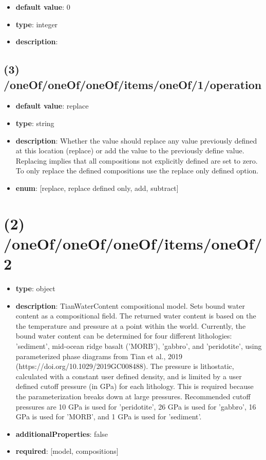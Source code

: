 \begin{itemize}[leftmargin=4em]\item {\bf default value}: 0
\item {\bf type}: integer
\item {\bf description}: 
\end{itemize}\subsection{(3) /oneOf/oneOf/oneOf/items/oneOf/1/operation}
\begin{itemize}[leftmargin=3em]\item {\bf default value}: replace
\item {\bf type}: string
\item {\bf description}: Whether the value should replace any value previously defined at this location (replace) or add the value to the previously define value. Replacing implies that all compositions not explicitly defined are set to zero. To only replace the defined compositions use the replace only defined option.
\item {\bf enum}: [replace, replace defined only, add, subtract]\end{itemize}\section{(2) /oneOf/oneOf/oneOf/items/oneOf/2}
\begin{itemize}[leftmargin=2em]\item {\bf type}: object
\item {\bf description}: TianWaterContent compositional model. Sets bound water content as a compositional field. The returned water content is based on the the temperature and pressure at a point within the world. Currently, the bound water content can be determined for four different lithologies: 'sediment', mid-ocean ridge basalt ('MORB'), 'gabbro', and 'peridotite', using parameterized phase diagrams from Tian et al., 2019 (https://doi.org/10.1029/2019GC008488). The pressure is lithostatic, calculated with a constant user defined density, and is limited by a user defined cutoff pressure (in GPa) for each lithology. This is required because the parameterization breaks down at large pressures. Recommended cutoff pressures are 10 GPa is used for 'peridotite', 26 GPa is used for 'gabbro', 16 GPa is used for 'MORB', and 1 GPa is used for 'sediment'.
\item {\bf additionalProperties}: false
\item {\bf required}: [model, compositions]\end{itemize}
